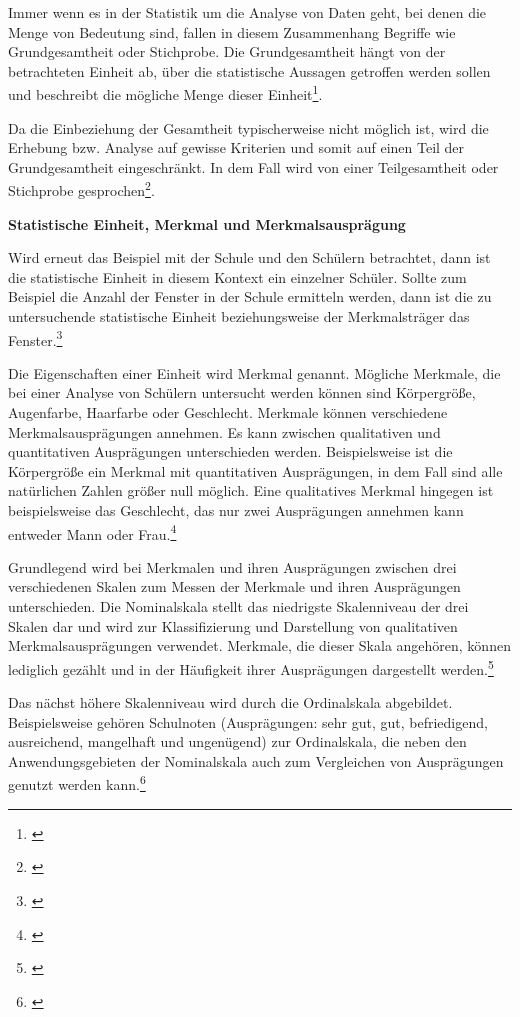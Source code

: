 Immer wenn es in der Statistik um die Analyse von Daten geht, bei denen die Menge von Bedeutung sind, fallen in diesem Zusammenhang Begriffe wie Grundgesamtheit oder Stichprobe. Die Grundgesamtheit hängt von der betrachteten Einheit ab, über die statistische Aussagen getroffen werden sollen und beschreibt die mögliche Menge dieser Einheit\footnote{\cite[vgl.][13]{Statistik2016}}.

Da die Einbeziehung der Gesamtheit typischerweise nicht möglich ist, wird die Erhebung bzw. Analyse auf gewisse Kriterien und somit auf einen Teil der Grundgesamtheit eingeschränkt. In dem Fall wird von einer Teilgesamtheit oder Stichprobe gesprochen\footnote{\cite[vgl.][13]{Statistik2016}}.

\textbf{Statistische Einheit, Merkmal und Merkmalsausprägung}

Wird erneut das Beispiel mit der Schule und den Schülern betrachtet, dann ist die statistische Einheit in diesem Kontext ein einzelner Schüler. Sollte zum Beispiel die Anzahl der Fenster in der Schule ermitteln werden, dann ist die zu untersuchende statistische Einheit beziehungsweise der Merkmalsträger das Fenster.\footnote{\cite[vgl.][13]{Statistik2016}}

Die Eigenschaften einer Einheit wird Merkmal genannt. Mögliche Merkmale, die bei einer Analyse von Schülern untersucht werden können sind Körpergröße, Augenfarbe, Haarfarbe oder Geschlecht. Merkmale können verschiedene Merkmalsausprägungen annehmen. Es kann zwischen qualitativen und quantitativen Ausprägungen unterschieden werden. Beispielsweise ist die Körpergröße ein Merkmal mit quantitativen Ausprägungen, in dem Fall sind alle natürlichen Zahlen größer null möglich. Eine qualitatives Merkmal hingegen ist beispielsweise das Geschlecht, das nur zwei Ausprägungen annehmen kann entweder Mann oder Frau.\footnote{\cite[vgl.][13\psqq]{Statistik2016}}

Grundlegend wird bei Merkmalen und ihren Ausprägungen zwischen drei verschiedenen Skalen zum Messen der Merkmale und ihren Ausprägungen unterschieden. Die Nominalskala stellt das niedrigste Skalenniveau der drei Skalen dar und wird zur Klassifizierung und Darstellung von qualitativen Merkmalsausprägungen verwendet. Merkmale, die dieser Skala angehören, können lediglich gezählt und in der Häufigkeit ihrer Ausprägungen dargestellt werden.\footnote{\cite[vgl.][15\psqq]{Statistik2016}}

Das nächst höhere Skalenniveau wird durch die Ordinalskala abgebildet. Beispielsweise gehören Schulnoten (Ausprägungen: sehr gut, gut, befriedigend, ausreichend, mangelhaft und ungenügend) zur Ordinalskala, die neben den Anwendungsgebieten der Nominalskala auch zum Vergleichen von Ausprägungen genutzt werden kann.\footnote{\cite[vgl.][15\psqq]{Statistik2016}}

